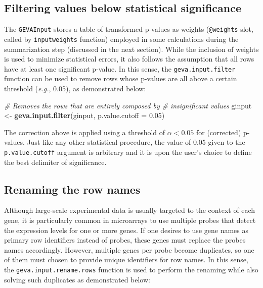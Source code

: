 \documentclass[
  12pt,
]{article}
\newenvironment{Shaded}{\begin{snugshade}}{\end{snugshade}}
\newcommand{\CommentTok}[1]{\textcolor[rgb]{0.56,0.35,0.01}{\textit{#1}}}
\newcommand{\DataTypeTok}[1]{\textcolor[rgb]{0.13,0.29,0.53}{#1}}
\newcommand{\FloatTok}[1]{\textcolor[rgb]{0.00,0.00,0.81}{#1}}
\newcommand{\KeywordTok}[1]{\textcolor[rgb]{0.13,0.29,0.53}{\textbf{#1}}}
\newcommand{\NormalTok}[1]{#1}
\newcommand{\StringTok}[1]{\textcolor[rgb]{0.31,0.60,0.02}{#1}}
\begin{document}
\hypertarget{filtering-values-below-statistical-significance}{%
\subsection{Filtering values below statistical
significance}\label{filtering-values-below-statistical-significance}}

The \texttt{GEVAInput} stores a table of transformed p-values as weights
(\texttt{@weights} slot, called by \texttt{inputweights} function)
employed in some calculations during the summarization step (discussed
in the next section). While the inclusion of weights is used to minimize
statistical errors, it also follows the assumption that all rows have at
least one significant p-value. In this sense, the
\texttt{geva.input.filter} function can be used to remove rows whose
p-values are all above a certain threshold (\emph{e.g.}, 0.05), as
demonstrated below:

\begin{Shaded}
\begin{Highlighting}[]
\CommentTok{# Removes the rows that are entirely composed by}
\CommentTok{# insignificant values}
\NormalTok{ginput <-}\StringTok{ }\KeywordTok{geva.input.filter}\NormalTok{(ginput, }\DataTypeTok{p.value.cutoff =} \FloatTok{0.05}\NormalTok{)}
\end{Highlighting}
\end{Shaded}

The correction above is applied using a threshold of \(\alpha < 0.05\)
for (corrected) p-values. Just like any other statistical procedure, the
value of 0.05 given to the \texttt{p.value.cutoff} argument is arbitrary
and it is upon the user's choice to define the best delimiter of
significance.

\hypertarget{renaming-the-row-names}{%
\subsection{Renaming the row names}\label{renaming-the-row-names}}

Although large-scale experimental data is usually targeted to the
context of each gene, it is particularly common in microarrays to use
multiple probes that detect the expression levels for one or more genes.
If one desires to use gene names as primary row identifiers instead of
probes, these genes must replace the probes names accordingly. However,
multiple genes per probe become duplicates, so one of them must chosen
to provide unique identifiers for row names. In this sense, the
\texttt{geva.input.rename.rows} function is used to perform the renaming
while also solving such duplicates as demonstrated below:
\end{document}
